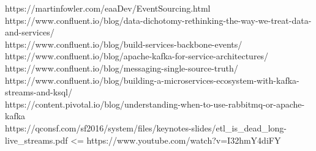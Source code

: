 \documentclass[]{article}
\begin{document}
https://martinfowler.com/eaaDev/EventSourcing.html\\
https://www.confluent.io/blog/data-dichotomy-rethinking-the-way-we-treat-data-and-services/\\
https://www.confluent.io/blog/build-services-backbone-events/\\
https://www.confluent.io/blog/apache-kafka-for-service-architectures/\\
https://www.confluent.io/blog/messaging-single-source-truth/\\
https://www.confluent.io/blog/building-a-microservices-ecosystem-with-kafka-streams-and-ksql/\\
https://content.pivotal.io/blog/understanding-when-to-use-rabbitmq-or-apache-kafka\\
https://qconsf.com/sf2016/system/files/keynotes-slides/etl\_is\_dead\_long-live\_streams.pdf
\textless{}= https://www.youtube.com/watch?v=I32hmY4diFY
\end{document}
